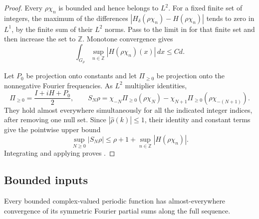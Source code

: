 \begin{proof}
Every $\rho\chi_n$ is bounded and hence belongs to $L^2$.
For a fixed finite set of integers, the maximum of the differences
$|H_\delta(\rho\chi_n)-H(\rho\chi_n)|$ tends to zero in $L^1$,
by the finite sum of their $L^2$ norms. Pass to the limit in
 for that finite set and then increase the
set to $\mathbb Z$. Monotone convergence gives
\begin{equation}\label{eq:fourier-H-max}
 \int_{G_\rho}\sup_{n\in\mathbb Z}|H(\rho\chi_n)(x)|\,dx\le Cd.
\end{equation}

Let $P_0$ be projection onto constants and let $\Pi_{\ge0}$ be projection
onto the nonnegative Fourier frequencies. As $L^2$ multiplier identities,
\[
 \Pi_{\ge0}=\frac{I+iH+P_0}{2},
 \qquad
 S_N\rho=
 \chi_{-N}\Pi_{\ge0}(\rho\chi_N)
 -\chi_{N+1}\Pi_{\ge0}(\rho\chi_{-(N+1)}).
\]
They hold almost everywhere simultaneously for all the indicated
integer indices, after removing one null set.
Since $|\widehat\rho(k)|\le1$, their identity and constant terms give
the pointwise upper bound
\[
 \sup_{N\ge0}|S_N\rho|
 \le \rho+1+\sup_{n\in\mathbb Z}|H(\rho\chi_n)|.
\]
Integrating and applying  proves
.
\end{proof}

\subsection{Bounded inputs}

\begin{proposition}\label{prop:fourier-bounded}
Every bounded complex-valued periodic function has almost-everywhere
convergence of its symmetric Fourier partial sums along the full
sequence.
\end{proposition}

